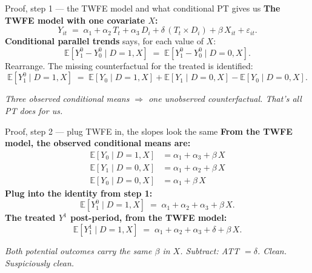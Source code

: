\documentclass[aspectratio=169,11pt]{beamer}
\begin{document}

\begin{frame}{Proof, step 1 --- the TWFE model and what conditional PT gives us}
\vspace{0.4em}
\textbf{The TWFE model with one covariate $X$:}
\[
Y_{it} \;=\; \alpha_1 + \alpha_2\, T_t + \alpha_3\, D_i + \delta\,(T_t \times D_i) + \beta\, X_{it} + \varepsilon_{it}.
\]
\vspace{0.3em}
\textbf{Conditional parallel trends} says, for each value of $X$:
\[
\mathbb{E}[Y^0_1 - Y^0_0 \mid D{=}1, X] \;=\; \mathbb{E}[Y^0_1 - Y^0_0 \mid D{=}0, X].
\]
\vspace{0.1em}
Rearrange. The missing counterfactual for the treated is identified:
\[
\mathbb{E}[Y^0_1 \mid D{=}1, X] \;=\; \mathbb{E}[Y_0 \mid D{=}1, X] + \mathbb{E}[Y_1 \mid D{=}0, X] - \mathbb{E}[Y_0 \mid D{=}0, X].
\]
\vspace{0.2em}
\begin{center}
\footnotesize\color{warmgray}\itshape
Three observed conditional means $\Rightarrow$ one unobserved counterfactual. \;That's all PT does for us.
\end{center}
\end{frame}

\begin{frame}{Proof, step 2 --- plug TWFE in, the slopes look the same}
\vspace{0.4em}
\textbf{From the TWFE model, the observed conditional means are:}
\begin{align*}
\mathbb{E}[Y_0 \mid D{=}1, X] &= \alpha_1 + \alpha_3 + \beta\, X \\
\mathbb{E}[Y_1 \mid D{=}0, X] &= \alpha_1 + \alpha_2 + \beta\, X \\
\mathbb{E}[Y_0 \mid D{=}0, X] &= \alpha_1 + \beta\, X
\end{align*}
\textbf{Plug into the identity from step 1:}
\[
\mathbb{E}[Y^0_1 \mid D{=}1, X] \;=\; \alpha_1 + \alpha_2 + \alpha_3 + \beta\, X.
\]
\textbf{The treated $Y^1$ post-period, from the TWFE model:}
\[
\mathbb{E}[Y^1_1 \mid D{=}1, X] \;=\; \alpha_1 + \alpha_2 + \alpha_3 + \delta + \beta\, X.
\]
\begin{center}
\footnotesize\color{warmgray}\itshape
Both potential outcomes carry the \textit{same} $\beta$ in $X$. \;Subtract: ATT $= \delta$. \;Clean. \;\textit{Suspiciously clean.}
\end{center}
\end{frame}
\end{document}
